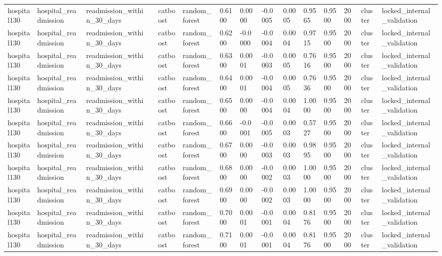 \begin{tabular}{lllllllllllllll}
hospital130 & hospital\_readmission & readmission\_within\_30\_days &  & catboost & random\_forest & 0.6100 & 0.0000 & -0.0005 & 0.0005 & 0.9565 & 0.9500 & 2000 & cluster & locked\_internal\_validation \\
hospital130 & hospital\_readmission & readmission\_within\_30\_days &  & catboost & random\_forest & 0.6200 & -0.0000 & -0.0004 & 0.0004 & 0.9715 & 0.9500 & 2000 & cluster & locked\_internal\_validation \\
hospital130 & hospital\_readmission & readmission\_within\_30\_days &  & catboost & random\_forest & 0.6300 & 0.0001 & -0.0003 & 0.0005 & 0.7616 & 0.9500 & 2000 & cluster & locked\_internal\_validation \\
hospital130 & hospital\_readmission & readmission\_within\_30\_days &  & catboost & random\_forest & 0.6400 & 0.0001 & -0.0004 & 0.0005 & 0.7636 & 0.9500 & 2000 & cluster & locked\_internal\_validation \\
hospital130 & hospital\_readmission & readmission\_within\_30\_days &  & catboost & random\_forest & 0.6500 & 0.0000 & -0.0004 & 0.0004 & 1.0000 & 0.9500 & 2000 & cluster & locked\_internal\_validation \\
hospital130 & hospital\_readmission & readmission\_within\_30\_days &  & catboost & random\_forest & 0.6600 & -0.0001 & -0.0005 & 0.0003 & 0.5727 & 0.9500 & 2000 & cluster & locked\_internal\_validation \\
hospital130 & hospital\_readmission & readmission\_within\_30\_days &  & catboost & random\_forest & 0.6700 & 0.0000 & -0.0003 & 0.0003 & 0.9895 & 0.9500 & 2000 & cluster & locked\_internal\_validation \\
hospital130 & hospital\_readmission & readmission\_within\_30\_days &  & catboost & random\_forest & 0.6800 & 0.0000 & -0.0002 & 0.0003 & 1.0000 & 0.9500 & 2000 & cluster & locked\_internal\_validation \\
hospital130 & hospital\_readmission & readmission\_within\_30\_days &  & catboost & random\_forest & 0.6900 & 0.0000 & -0.0002 & 0.0003 & 1.0000 & 0.9500 & 2000 & cluster & locked\_internal\_validation \\
hospital130 & hospital\_readmission & readmission\_within\_30\_days &  & catboost & random\_forest & 0.7000 & 0.0001 & -0.0001 & 0.0004 & 0.8176 & 0.9500 & 2000 & cluster & locked\_internal\_validation \\
hospital130 & hospital\_readmission & readmission\_within\_30\_days &  & catboost & random\_forest & 0.7100 & 0.0001 & -0.0001 & 0.0004 & 0.8176 & 0.9500 & 2000 & cluster & locked\_internal\_validation \\

\end{tabular}
